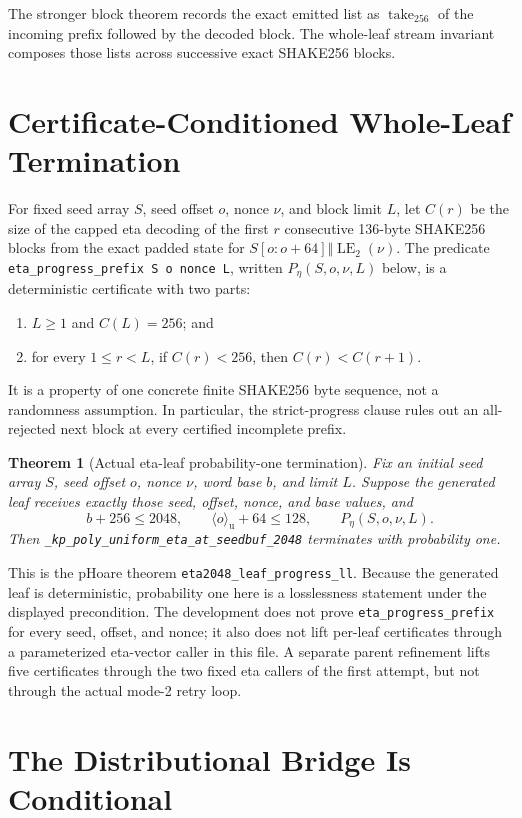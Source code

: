 \documentclass[11pt]{article}
\theoremstyle{definition}
\theoremstyle{plain}
\newtheorem{theorem}{Theorem}
\theoremstyle{remark}
\newcommand{\code}[1]{\nolinkurl{#1}}
\newcommand{\uint}[1]{\langle #1\rangle_{\mathrm u}}
\begin{document}
The stronger block theorem records the exact emitted list as
$\operatorname{take}_{256}$ of the incoming prefix followed by the decoded
block.  The whole-leaf stream invariant composes those lists across successive
exact SHAKE256 blocks.

\section{Certificate-Conditioned Whole-Leaf Termination}

For fixed seed array $S$, seed offset $o$, nonce $\nu$, and block limit $L$,
let $C(r)$ be the size of the capped eta decoding of the first $r$ consecutive
136-byte SHAKE256 blocks from the exact padded state for
$S[o:o+64]\Vert\operatorname{LE}_2(\nu)$.  The predicate
\code{eta_progress_prefix S o nonce L}, written
$P_\eta(S,o,\nu,L)$ below, is a deterministic certificate with two parts:
\begin{enumerate}
\item $L\ge1$ and $C(L)=256$; and
\item for every $1\le r<L$, if $C(r)<256$, then $C(r)<C(r+1)$.
\end{enumerate}
It is a property of one concrete finite SHAKE256 byte sequence, not a
randomness assumption.  In particular, the strict-progress clause rules out
an all-rejected next block at every certified incomplete prefix.

\begin{theorem}[Actual eta-leaf probability-one termination]
Fix an initial seed array $S$, seed offset $o$, nonce $\nu$, word base $b$,
and limit $L$.  Suppose the generated leaf receives exactly those seed,
offset, nonce, and base values, and
\[
  b+256\le2048,
  \qquad \uint{o}+64\le128,
  \qquad P_\eta(S,o,\nu,L).
\]
Then
\code{_kp_poly_uniform_eta_at_seedbuf_2048} terminates with probability one.
\end{theorem}

This is the pHoare theorem \code{eta2048_leaf_progress_ll}.  Because the
generated leaf is deterministic, probability one here is a losslessness
statement under the displayed precondition.  The development does not prove
\code{eta_progress_prefix} for every seed, offset, and nonce; it also does not
lift per-leaf certificates through a parameterized eta-vector caller in this
file.  A separate parent refinement lifts five certificates through the two
fixed eta callers of the first attempt, but not through the actual mode-2
retry loop.

\section{The Distributional Bridge Is Conditional}
\end{document}
